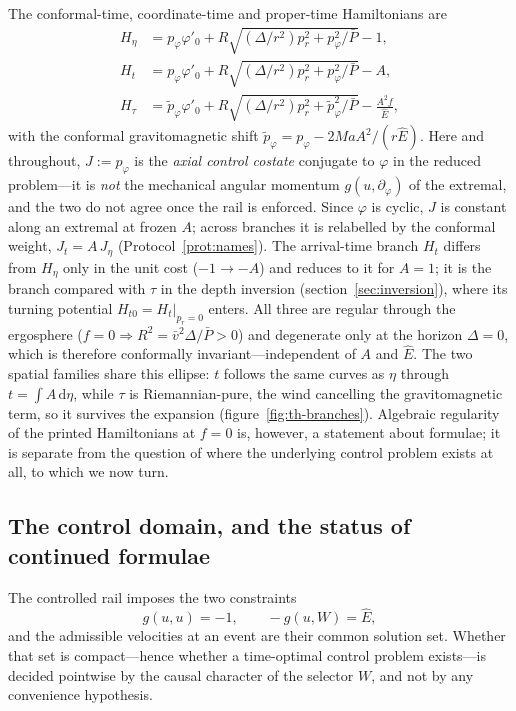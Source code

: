 \documentclass[12pt]{iopart}
\theoremstyle{plain}
\theoremstyle{definition}
\theoremstyle{remark}
\newcommand{\Ehat}{\hat E}
\newcommand{\dd}{\mathrm{d}}
\begin{document}
The conformal-time, coordinate-time and proper-time Hamiltonians are
\begin{align}
    H_\eta&=p_\varphi\varphi'_0
        +R\sqrt{(\Delta/r^2)p_r^2+p_\varphi^2/\bar P}-1,
    \label{eq:Heta}\\
    H_t&=p_\varphi\varphi'_0
        +R\sqrt{(\Delta/r^2)p_r^2+p_\varphi^2/\bar P}-A,
    \label{eq:Ht-tk}\\
    H_\tau&=\tilde p_\varphi\varphi'_0
        +R\sqrt{(\Delta/r^2)p_r^2+\tilde p_\varphi^2/\bar P}-\frac{A^2 f}{\Ehat},
    \label{eq:Htau-tk}
\end{align}
with the conformal gravitomagnetic shift
$\tilde p_\varphi=p_\varphi-2MaA^2/(r\Ehat)$. Here and throughout, $J:=p_\varphi$
is the \emph{axial control costate} conjugate to $\varphi$ in the reduced
problem---it is \emph{not} the mechanical angular momentum $g(u,\partial_\varphi)$
of the extremal, and the two do not agree once the rail is enforced. Since
$\varphi$ is cyclic, $J$ is constant along an extremal at frozen $A$; across
branches it is relabelled by the conformal weight, $J_t=A\,J_\eta$
(Protocol~\ref{prot:names}). The arrival-time branch $H_t$ differs
from $H_\eta$ only in the unit cost ($-1\to-A$) and reduces to it for $A=1$; it is
the branch compared with $\tau$ in the depth inversion
(section~\ref{sec:inversion}), where its turning potential
$H_{t0}=H_t|_{p_r=0}$ enters. All three are regular through the
ergosphere ($f=0\Rightarrow R^2=\bar v^2\Delta/\bar P>0$) and degenerate only at
the horizon $\Delta=0$, which is therefore conformally invariant---independent of
$A$ and $\Ehat$. The two spatial families share this ellipse: $t$ follows the same
curves as $\eta$ through $t=\int A\,\dd\eta$, while $\tau$ is Riemannian-pure, the
wind cancelling the gravitomagnetic term, so it survives the expansion
(figure~\ref{fig:th-branches}). Algebraic regularity of the printed Hamiltonians
at $f=0$ is, however, a statement about formulae; it is separate from the
question of where the underlying control problem exists at all, to which we now
turn.

\subsection{The control domain, and the status of continued formulae}
\label{sec:domain}
The controlled rail imposes the two constraints
\begin{equation}
    g(u,u)=-1,\qquad -g(u,W)=\Ehat ,
    \label{eq:rail-constraints}
\end{equation}
and the admissible velocities at an event are their common solution set. Whether
that set is compact---hence whether a time-optimal control problem exists---is
decided pointwise by the causal character of the selector $W$, and not by any
convenience hypothesis.
\end{document}
